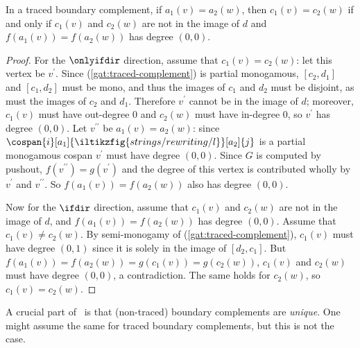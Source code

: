 \begin{lemma}
    In a traced boundary complement, if \(
        a_1(v) = a_2(w)
    \), then \(
        c_1(v) = c_2(w)
    \) if and only if \(c_1(v)\) and \(c_2(w)\) are not in the image of \(d\)
    and \(f(a_1(v)) = f(a_2(w))\) has degree \((0,0)\).
\end{lemma}
\begin{proof}
    For the \(\onlyifdir\) direction, assume that \(c_1(v) = c_2(w)\): let this
    vertex be \(v^\prime\).
    Since (\ref{gat:traced-complement}) is partial monogamous, \([c_2,d_1]\) and
    \([c_1,d_2]\) must be mono, and thus the images of \(c_1\) and \(d_2\) must
    be disjoint, as must the images of \(c_2\) and \(d_1\).
    Therefore \(v^\prime\) cannot be in the image of \(d\); moreover, \(c_1(v)\)
    must have out-degree \(0\) and \(c_2(w)\) must have in-degree \(0\), so
    \(v^\prime\) has degree \((0,0)\).
    Let \(v^{\prime\prime}\) be \(a_1(v) = a_2(w)\): since \(
        \cospan{i}[a_1]{\iltikzfig{strings/rewriting/l}}[a_2]{j}
    \) is a partial monogamous cospan \(v^\prime\) must have degree \((0,0)\).
    Since \(G\) is computed by pushout, \(
        f(v^{\prime\prime}) = g(v^{\prime})
    \) and the degree of this vertex is contributed wholly by \(v^\prime\) and
    \(v^{\prime\prime}\).
    So \(f(a_1(v)) = f(a_2(w))\) also has degree \((0,0)\).

    Now for the \(\ifdir\) direction, assume that \(c_1(v)\) and \(c_2(w)\) are
    not in the image of \(d\), and \(f(a_1(v)) = f(a_2(w))\) has degree
    \((0,0)\).
    Assume that \(c_1(v) \neq c_2(w)\).
    By semi-monogamy of (\ref{gat:traced-complement}), \(c_1(v)\) must have
    degree \((0,1)\) since it is solely in the image of \([d_2, c_1]\).
    But \(f(a_1(v)) = f(a_2(w)) = g(c_1(v)) = g(c_2(w))\), \(c_1(v)\) and
    \(c_2(w)\) must have degree \((0,0)\), a contradiction.
    The same holds for \(c_2(w)\), so \(c_1(v) = c_2(w)\).
\end{proof}

A crucial part of~\cite{bonchi2021string} is that (non-traced) boundary
complements are \emph{unique}.
One might assume the same for traced boundary complements, but this is not the
case.

